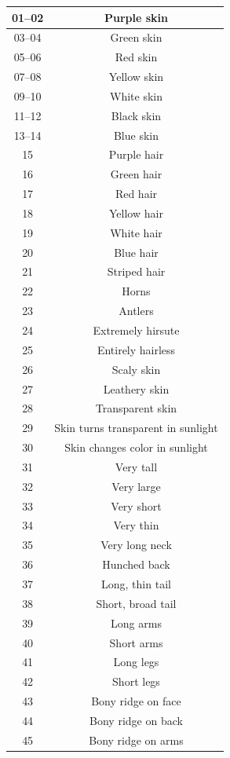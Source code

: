 \begin{longtable}{| c | c |}
01–02 & Purple skin  \\ \hline
03–04 & Green skin  \\ \hline
05–06 & Red skin  \\ \hline
07–08 & Yellow skin  \\ \hline
09–10 & White skin  \\ \hline
11–12 & Black skin  \\ \hline
13–14 & Blue skin  \\ \hline
15 & Purple hair  \\ \hline
16 & Green hair  \\ \hline
17 & Red hair  \\ \hline
18 & Yellow hair  \\ \hline
19 & White hair  \\ \hline
20 & Blue hair  \\ \hline
21 & Striped hair  \\ \hline
22 & Horns  \\ \hline
23 & Antlers  \\ \hline
24 & Extremely hirsute  \\ \hline
25 & Entirely hairless  \\ \hline
26 & Scaly skin  \\ \hline
27 & Leathery skin  \\ \hline
28 & Transparent skin  \\ \hline
29 & Skin turns transparent in sunlight  \\ \hline
30 & Skin changes color in sunlight  \\ \hline
31 & Very tall  \\ \hline
32 & Very large  \\ \hline
33 & Very short  \\ \hline
34 & Very thin  \\ \hline
35 & Very long neck  \\ \hline
36 & Hunched back  \\ \hline
37 & Long, thin tail  \\ \hline
38 & Short, broad tail  \\ \hline
39 & Long arms  \\ \hline
40 & Short arms  \\ \hline
41 & Long legs  \\ \hline
42 & Short legs  \\ \hline
43 & Bony ridge on face  \\ \hline
44 & Bony ridge on back  \\ \hline
45 & Bony ridge on arms  \\ \hline

\end{longtable}
